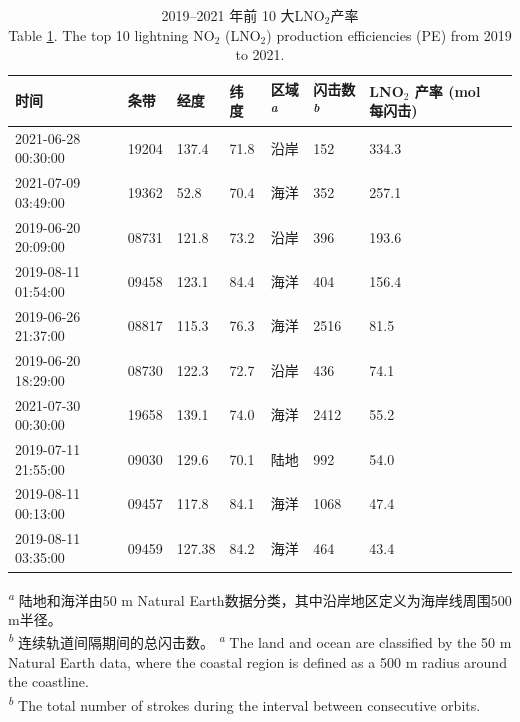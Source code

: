 \begin{table}[htbp]
\caption{2019--2021 年前 10 大LNO$_2$产率 \\
Table \ref{table:arctic_pe_lno2}. The top 10 lightning NO$_2$ (LNO$_2$) production efficiencies (PE) from 2019 to 2021.}
\label{table:arctic_pe_lno2}
\begin{tabular}{llllllll}
\hline
时间 &       条带 &   经度 &   纬度 &
区域\textsuperscript{\emph{a}} &
闪击数\textsuperscript{\emph{b}}  & \shortstack{LNO$_2$ 产率 \\ (mol每闪击)} \\
\hline
2021-06-28 00:30:00 &  19204 &  137.4 &  71.8 &  沿岸 &         152 &  334.3 \\
2021-07-09 03:49:00 &  19362 &   52.8 &  70.4 &  海洋 &         352 &  257.1 \\
2019-06-20 20:09:00 &  08731 &  121.8 &  73.2 &  沿岸 &         396 &  193.6 \\
2019-08-11 01:54:00 &  09458 &  123.1 &  84.4 &  海洋 &         404 &  156.4 \\
2019-06-26 21:37:00 &  08817 &  115.3 &  76.3 &  海洋 &        2516 &   81.5 \\
2019-06-20 18:29:00 &  08730 &  122.3 &  72.7 &  沿岸 &         436 &   74.1 \\
2021-07-30 00:30:00 &  19658 &  139.1 &  74.0 &  海洋 &        2412 &   55.2 \\
2019-07-11 21:55:00 &  09030 &  129.6 &  70.1 &   陆地 &         992 &   54.0 \\
2019-08-11 00:13:00 &  09457 &  117.8 &  84.1 &  海洋 &        1068 &   47.4 \\
2019-08-11 03:35:00 &  09459 &  127.38 &  84.2 &  海洋 &         464 &   43.4 \\
\hline
\end{tabular}
\footnotesize
\textsuperscript{\emph{a}} 陆地和海洋由50 m Natural Earth数据分类，其中沿岸地区定义为海岸线周围500 m半径。 \\
\textsuperscript{\emph{b}} 连续轨道间隔期间的总闪击数。
\textsuperscript{\emph{a}} The land and ocean are classified by the 50 m Natural Earth data, where the coastal region is defined as a 500 m radius around the coastline. \\
\textsuperscript{\emph{b}} The total number of strokes during the interval between consecutive orbits.
\end{table}

